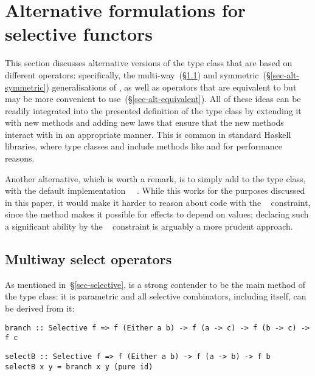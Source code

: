 \section{Alternative formulations for selective functors}
\label{sec-alternatives}

This section discusses alternative versions of the  type class
that are based on different  operators: specifically, the
multi-way~(\S\ref{sec-alt-multi}) and symmetric~(\S\ref{sec-alt-symmetric})
generalisations of , as well as operators that are equivalent to
 but may be more convenient to use~(\S\ref{sec-alt-equivalent}). All
of these ideas can be readily integrated into the presented definition of the
 type class by extending it with new methods and adding new laws
that ensure that the new methods interact with  in an appropriate
manner. This is common in standard Haskell libraries, where type classes
 and  include methods like \hs{*>} and \hs{>>} for
performance reasons.

Another alternative, which is worth a remark, is to simply add  to
the  type class, with the default implementation
~\hs{=}~. While this works for the purposes discussed in
this paper, it would make it harder to reason about code with the
~ constraint, since the  method makes it
possible for effects to depend on values; declaring such a significant ability
by the ~ constraint is arguably a more prudent approach.

\subsection{Multiway select operators}\label{sec-alt-multi}

As mentioned in~\S\ref{sec-selective},  is a strong contender to be
the main method of the  type class: it is parametric and all
selective combinators, including  itself, can be derived from it:

\vspace{1mm}
\begin{verbatim}
branch :: Selective f => f (Either a b) -> f (a -> c) -> f (b -> c) -> f c
\end{verbatim}
\vspace{0mm}
\begin{verbatim}
selectB :: Selective f => f (Either a b) -> f (a -> b) -> f b
selectB x y = branch x y (pure id)
\end{verbatim}
\vspace{1mm}

